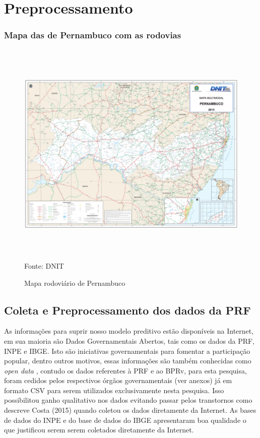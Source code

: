 \chapter{Preprocessamento}\label{pre}


\subsection{Mapa das de Pernambuco com as rodovias}

\begin{figure}[ht]
	\centering
	\caption{Mapa rodoviário de Pernambuco}
	\includegraphics[width=150mm, height=110mm]{Figuras/Anexos/Mapa-pe.pdf}\\
	\tiny Fonte: DNIT
\end{figure}


\section{Coleta e Preprocessamento dos dados da PRF}\label{intro:metodologia}


As informações para suprir nosso modelo preditivo estão disponíveis na Internet, em sua maioria são Dados Governamentais Abertos, tais como os dados
da PRF, INPE e IBGE. Isto são iniciativas governamentais para fomentar a participação popular, dentro outros motivos, essas informações são também 
conhecidas como \textit{open data} \cite{DadosGoverno}, contudo os dados referentes à PRF e ao BPRv, para esta pesquisa, foram cedidos pelos respectivos 
órgãos governamentais (ver anexos) já em formato CSV para serem utilizados exclusivamente nesta pesquisa. Isso possibilitou ganho qualitativo nos dados evitando 
passar pelos transtornos como descreve Costa (2015) quando coletou os dados diretamente da Internet.\cite{Costa2015} 
As bases de dados do INPE e do base de dados do IBGE apresentaram boa qualidade o que justificou serem serem coletados diretamente da Internet.


